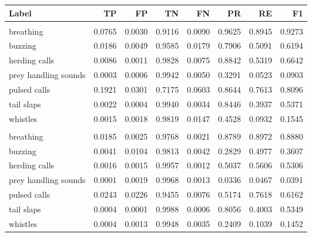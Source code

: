 
\begin{tabular}[t]{lrrrrrrr}
\toprule
Label & TP & FP & TN & FN & PR & RE & F1\\
\midrule
\addlinespace[0.3em]
\multicolumn{8}{l}{\textbf{select}}\\
\hspace{1em}breathing & 0.0765 & 0.0030 & 0.9116 & 0.0090 & 0.9625 & 0.8945 & 0.9273\\
\hspace{1em}buzzing & 0.0186 & 0.0049 & 0.9585 & 0.0179 & 0.7906 & 0.5091 & 0.6194\\
\hspace{1em}herding calls & 0.0086 & 0.0011 & 0.9828 & 0.0075 & 0.8842 & 0.5319 & 0.6642\\
\hspace{1em}prey handling sounds & 0.0003 & 0.0006 & 0.9942 & 0.0050 & 0.3291 & 0.0523 & 0.0903\\
\hspace{1em}pulsed calls & 0.1921 & 0.0301 & 0.7175 & 0.0603 & 0.8644 & 0.7613 & 0.8096\\
\hspace{1em}tail slaps & 0.0022 & 0.0004 & 0.9940 & 0.0034 & 0.8446 & 0.3937 & 0.5371\\
\hspace{1em}whistles & 0.0015 & 0.0018 & 0.9819 & 0.0147 & 0.4528 & 0.0932 & 0.1545\\
\addlinespace[0.3em]
\multicolumn{8}{l}{\textbf{all}}\\
\hspace{1em}breathing & 0.0185 & 0.0025 & 0.9768 & 0.0021 & 0.8789 & 0.8972 & 0.8880\\
\hspace{1em}buzzing & 0.0041 & 0.0104 & 0.9813 & 0.0042 & 0.2829 & 0.4977 & 0.3607\\
\hspace{1em}herding calls & 0.0016 & 0.0015 & 0.9957 & 0.0012 & 0.5037 & 0.5606 & 0.5306\\
\hspace{1em}prey handling sounds & 0.0001 & 0.0019 & 0.9968 & 0.0013 & 0.0336 & 0.0467 & 0.0391\\
\hspace{1em}pulsed calls & 0.0243 & 0.0226 & 0.9455 & 0.0076 & 0.5174 & 0.7618 & 0.6162\\
\hspace{1em}tail slaps & 0.0004 & 0.0001 & 0.9988 & 0.0006 & 0.8056 & 0.4003 & 0.5349\\
\hspace{1em}whistles & 0.0004 & 0.0013 & 0.9948 & 0.0035 & 0.2409 & 0.1039 & 0.1452\\
\bottomrule
\end{tabular}
